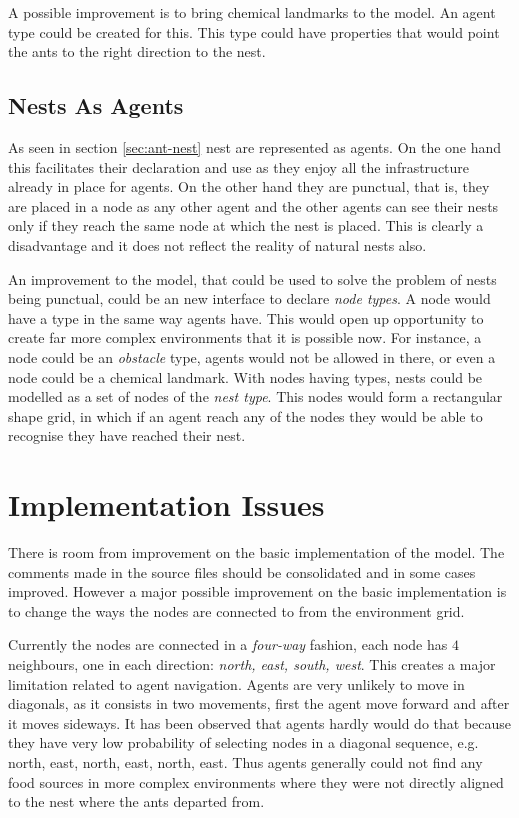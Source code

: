 A possible improvement is to bring chemical landmarks to the model. An agent type could be created for this. This type could have properties that would point the ants to the right direction to the nest.

\subsection{Nests As Agents}

As seen in section \ref{sec:ant-nest} nest are represented as agents. On the one hand this facilitates their declaration and use as they enjoy all the infrastructure already in place for agents. On the other hand they are punctual, that is, they are placed in a node as any other agent and the other agents can see their nests only if they reach the same node at which the nest is placed. This is clearly a disadvantage and it does not reflect the reality of natural nests also.

An improvement to the model, that could be used to solve the problem of nests being punctual, could be an new interface to declare \emph{node types}. A node would have a type in the same way agents have. This would open up opportunity to create far more complex environments that it is possible now. For instance, a node could be an  \emph{obstacle} type, agents would not be allowed in there, or even a node could be a chemical landmark. With nodes having types, nests could be modelled as a set of nodes of the \emph{nest type}. This nodes would form a rectangular shape grid, in which if an agent reach any of the nodes they would be able to recognise they have reached their nest.

\section{Implementation Issues}

There is room from improvement on the basic implementation of the model. The comments made in the source files should be consolidated and in some cases improved. However a major possible improvement on the basic implementation is to change the ways the nodes are connected to from the environment grid.  

Currently the nodes are connected in a \emph{four-way} fashion, each node has $4$ neighbours, one in each direction: \emph{north, east, south, west}. This creates a major limitation related to agent navigation. Agents are very unlikely to move in diagonals, as it consists in two movements, first the agent move forward and after it moves sideways. It has been observed that agents hardly would do that because they have very low probability of selecting nodes in a diagonal sequence, e.g. north, east, north, east, north, east. Thus agents generally could not find any food sources in more complex environments where they were not directly aligned to the nest where the ants departed from.

